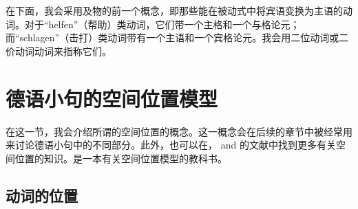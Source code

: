 在下面，我会采用及物的前一个概念，即那些能在被动式中将宾语变换为主语的动词。对于“helfen”（帮助）类动词，它们带一个主格和一个与格论元；而“schlagen”（击打）类动词带有一个主语和一个宾格论元。我会用二位动词或二价动词动词来指称它们。

\section{德语小句的空间位置模型}
\label{sec-topo}
\label{Abschnitt-Toplogie}

%
在这一节，我会介绍所谓的空间位置的概念。这一概念会在后续的章节中被经常用来讨论德语小句中的不同部分。此外，也可以在， and 的文献中找到更多有关空间位置的知识。是一本有关空间位置模型的教科书。

\subsection{动词的位置}

